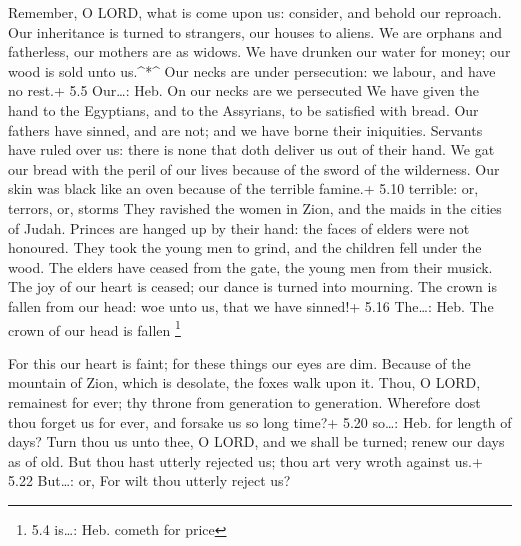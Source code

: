  Remember, O LORD, what is come upon us: consider, and
behold our reproach.  Our inheritance is turned to
strangers, our houses to aliens.  We are orphans and
fatherless, our mothers are as widows.  We have drunken our
water for money; our wood is sold unto us.\^{}*\^{}  Our
necks are under persecution: we labour, and have no rest.+ 5.5
Our\ldots: Heb. On our necks are we persecuted  We have
given the hand to the Egyptians, and to the Assyrians, to be satisfied
with bread.  Our fathers have sinned, and are not; and we
have borne their iniquities.  Servants have ruled over us:
there is none that doth deliver us out of their hand.  We
gat our bread with the peril of our lives because of the sword of the
wilderness.  Our skin was black like an oven because of the
terrible famine.+ 5.10 terrible: or, terrors, or, storms 
They ravished the women in Zion, and the maids in the cities of Judah.
 Princes are hanged up by their hand: the faces of elders
were not honoured.  They took the young men to grind, and
the children fell under the wood.  The elders have ceased
from the gate, the young men from their musick.  The joy of
our heart is ceased; our dance is turned into mourning. 
The crown is fallen from our head: woe unto us, that we have sinned!+
5.16 The\ldots: Heb. The crown of our head is fallen \footnote{5.4
  is\ldots: Heb. cometh for price}

 For this our heart is faint; for these things our eyes are
dim.  Because of the mountain of Zion, which is desolate,
the foxes walk upon it.  Thou, O LORD, remainest for ever;
thy throne from generation to generation.  Wherefore dost
thou forget us for ever, and forsake us so long time?+ 5.20 so\ldots:
Heb. for length of days?  Turn thou us unto thee, O LORD,
and we shall be turned; renew our days as of old.  But thou
hast utterly rejected us; thou art very wroth against us.+ 5.22
But\ldots: or, For wilt thou utterly reject us?
